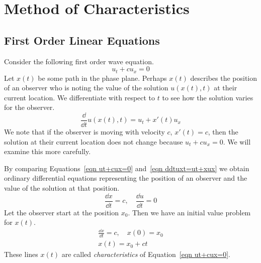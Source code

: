 \flushbottom









\chapter{Method of Characteristics}










\section{First Order Linear Equations}




Consider the following first order wave equation.
\begin{equation}
  \label{eqn ut+cux=0}
  u_t + c u_x = 0
\end{equation}
Let $x(t)$ be some path in the phase plane.  Perhaps $x(t)$ describes the
position of an observer who is noting the value of the solution $u(x(t),t)$
at their current location.  We differentiate with respect to $t$ to see 
how the solution varies for the observer.
\begin{equation}
  \label{eqn ddtuxt=ut+xux}
  \frac{\dd}{\dd t} u(x(t),t) = u_t + x'(t) u_x
\end{equation}
We note that if the observer is moving with velocity $c$, $x'(t) = c$, 
then the solution at their current location does not change because
$u_t + c u_x = 0$.  We will examine this more carefully.

By comparing Equations~\ref{eqn ut+cux=0} and~\ref{eqn ddtuxt=ut+xux} we 
obtain ordinary differential equations representing the position of an 
observer and the value of the solution at that position.
\[
\frac{\dd x}{\dd t} = c, \quad \frac{\dd u}{\dd t} = 0
\]
Let the observer start at the position $x_0$.  Then we have an initial value
problem for $x(t)$.
\begin{gather*}
  \frac{\dd x}{\dd t} = c, \quad x(0) = x_0
  \\
  x(t) = x_0 + c t
\end{gather*}
These lines $x(t)$ are called \textit{characteristics} of 
Equation~\ref{eqn ut+cux=0}.

